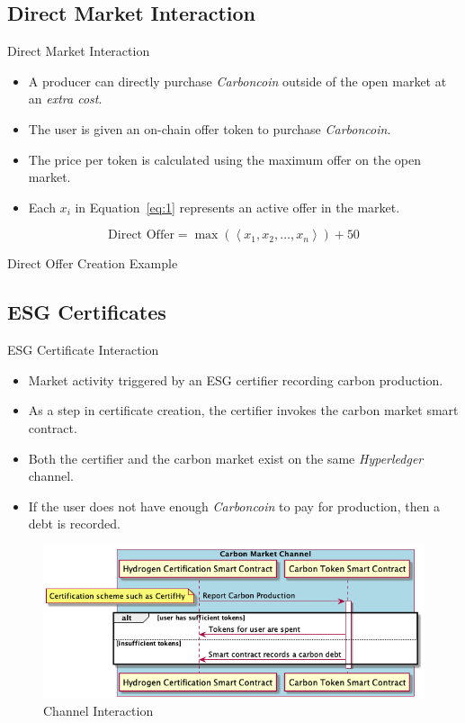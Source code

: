 \subsection{Direct Market Interaction}
\begin{frame}{Direct Market Interaction}
    \begin{itemize}
        \item A producer can directly purchase
              \textit{Carboncoin} outside of the open market
              at an \textit{extra cost}.
        \item The user is given an on-chain offer token to purchase
              \textit{Carboncoin}.
        \item The price per token is calculated using the maximum offer on the
              open market.
        \item Each $x_i$ in Equation~\ref{eq:1} represents an active offer
              in the market.
    \end{itemize}
    \begin{equation}
        \text{Direct Offer} =
        \max \left(\left\langle x_1, x_2, \dots, x_n \right\rangle\right) + 50
        \label{eq:1}
    \end{equation}
\end{frame}
\begin{frame}{Direct Offer Creation Example}
    \begin{adjustbox}{max totalsize={1\textwidth}{0.85\textheight},center}
        
    \end{adjustbox}
\end{frame}
\subsection{ESG Certificates}
\begin{frame}{ESG Certificate Interaction}
    \begin{itemize}
        \item Market activity triggered by an ESG certifier recording
              carbon production.
        \item As a step in certificate creation, the certifier invokes
              the carbon market smart contract.
        \item Both the certifier and the carbon market exist on the
              same \textit{Hyperledger} channel.
        \item If the user does not have enough \textit{Carboncoin}
              to pay for production, then a debt is recorded.
    \end{itemize}
    \begin{figure}
        \caption{Channel Interaction}
        \centering
        \includegraphics[height=0.5\textheight, width=0.5\linewidth,
            keepaspectratio]{photos/chain.png}
    \end{figure}
\end{frame}

